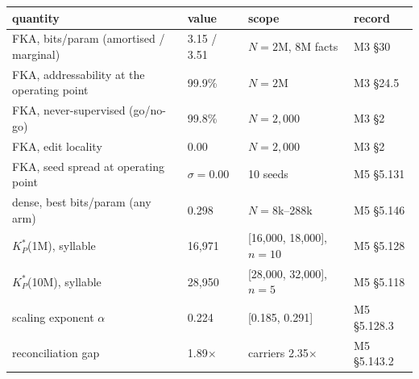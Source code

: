 \footnotesize
\begin{tabular}{@{}p{4.9cm}p{2.5cm}p{3.6cm}p{2.4cm}@{}}
\toprule
quantity & value & scope & record \\
\midrule
FKA, bits/param (amortised / marginal) & 3.15 / 3.51 & $N=2$M, 8M facts & M3 \S30 \\
FKA, addressability at the operating point & 99.9\% & $N=2$M & M3 \S24.5 \\
FKA, never-supervised (go/no-go) & 99.8\% & $N=2{,}000$ & M3 \S2 \\
FKA, edit locality & 0.00 & $N=2{,}000$ & M3 \S2 \\
FKA, seed spread at operating point & $\sigma = 0.00$ & 10 seeds & M5 \S5.131 \\
dense, best bits/param (any arm) & 0.298 & $N=8$k--288k & M5 \S5.146 \\
$K^*_P$(1M), syllable & 16,971 & [16,000, 18,000], $n=10$ & M5 \S5.128 \\
$K^*_P$(10M), syllable & 28,950 & [28,000, 32,000], $n=5$ & M5 \S5.118 \\
scaling exponent $\alpha$ & 0.224 & [0.185, 0.291] & M5 \S5.128.3 \\
reconciliation gap & 1.89$\times$ & carriers 2.35$\times$ & M5 \S5.143.2 \\
\bottomrule
\end{tabular}
